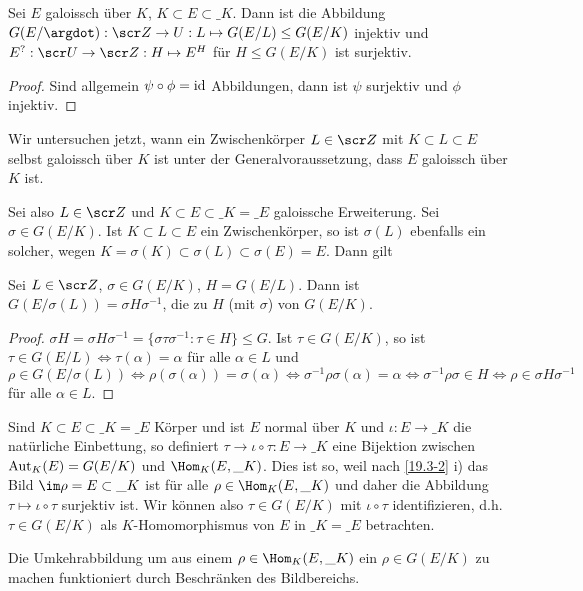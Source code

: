 \begin{kor} \label{19.4-14}
	Sei $E$ galoissch über $K$, $K \subset E \subset \_K$.
	Dann ist die Abbildung $G(E / \argdot): \scr Z \to U : L \mapsto G(E / L) \le G(E / K)$ injektiv und $E^? : \scr U \to \scr Z : H \mapsto E^H$ für $H \le G(E / K)$ ist surjektiv.
	\begin{proof}
		Sind allgemein $\psi \circ \phi = \operatorname{id}$ Abbildungen, dann ist $\psi$ surjektiv und $\phi$ injektiv.
	\end{proof}
\end{kor}

Wir untersuchen jetzt, wann ein Zwischenkörper $L \in \scr Z$ mit $K \subset L \subset E$ selbst galoissch über $K$ ist unter der Generalvoraussetzung, dass $E$ galoissch über $K$ ist.

Sei also $L \in \scr Z$ und $K \subset E \subset \_K = \_E$ galoissche Erweiterung.
Sei $\sigma \in G(E / K)$.
Ist $K \subset L \subset E$ ein Zwischenkörper, so ist $\sigma(L)$ ebenfalls ein solcher, wegen $K = \sigma(K) \subset \sigma(L) \subset \sigma(E) = E$.
Dann gilt

\begin{st} \label{19.4-15}
	Sei $L \in \scr Z$, $\sigma \in G(E / K)$, $H = G(E / L)$.
	Dann ist $G(E / \sigma(L)) = \sigma H \sigma^{-1}$, die zu $H$ (mit $\sigma$)  von $G(E / K)$.
	\begin{proof}
		$\sigma H = \sigma H \sigma^{-1} = \{ \sigma \tau \sigma^{-1} : \tau \in H \} \le G$.
		Ist $\tau \in G(E / K)$, so ist $\tau \in G(E / L) \iff \tau(\alpha) = \alpha$ für alle $\alpha \in L$ und $\rho \in G(E / \sigma(L)) \iff \rho(\sigma(\alpha)) = \sigma(\alpha) \iff \sigma^{-1}\rho\sigma(\alpha) = \alpha \iff \sigma^{-1}\rho\sigma \in H \iff \rho \in \sigma H \sigma^{-1}$ für alle $\alpha \in L$.
	\end{proof}
\end{st}

\begin{nt} \label{19.4-16}
	Sind $K \subset E \subset \_K = \_E$ Körper und ist $E$ normal über $K$ und $\iota: E \to \_K$ die natürliche Einbettung, so definiert $\tau \to \iota \circ \tau : E \to \_K$ eine Bijektion zwischen $\operatorname{Aut}_K(E) = G(E / K)$ und $\Hom_K(E, \_K)$.
	Dies ist so, weil nach \ref{19.3-2} i) das Bild $\im \rho = E \subset \_K$ ist für alle $\rho \in \Hom_K (E, \_K)$ und daher die Abbildung $\tau \mapsto \iota \circ \tau$ surjektiv ist.
	Wir können also $\tau \in G(E / K)$ mit $\iota \circ \tau$ identifizieren, d.h. $\tau \in G(E / K)$ als $K$-Homomorphismus von $E$ in $\_K = \_E$ betrachten.

	Die Umkehrabbildung um aus einem $\rho \in \Hom_K(E, \_K)$ ein $\rho \in G(E / K)$ zu machen funktioniert durch Beschränken des Bildbereichs.
\end{nt}


